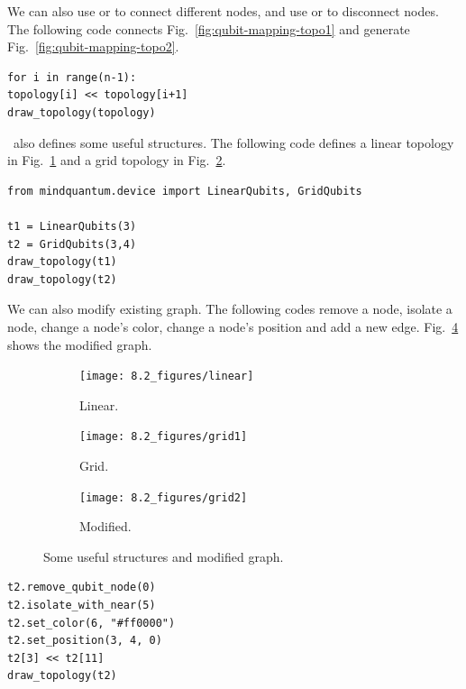 We can also use  or  to connect different nodes, and use  or  to disconnect nodes. The following code connects Fig.~\ref{fig:qubit-mapping-topo1} and generate Fig.~\ref{fig:qubit-mapping-topo2}.

\begin{lstlisting}
for i in range(n-1):
topology[i] << topology[i+1]
draw_topology(topology)
\end{lstlisting}

\MindQuantum\ also defines some useful structures. The following code defines a linear topology in Fig.~\ref{fig:qubit-mapping-linear} and a grid topology in Fig.~\ref{fig:qubit-mapping-grid1}.

\begin{lstlisting}
from mindquantum.device import LinearQubits, GridQubits

t1 = LinearQubits(3)
t2 = GridQubits(3,4)
draw_topology(t1)
draw_topology(t2)
\end{lstlisting}

We can also modify existing graph. The following codes remove a node, isolate a node, change a node's color, change a node's position and add a new edge. Fig.~\ref{fig:qubit-mapping-grid2} shows the modified graph.

\begin{figure}[H]
	\centering

	\begin{subfigure}{0.1\textwidth}
		\texttt{[image: 8.2\_figures/linear]}
		\caption{Linear.}
		\label{fig:qubit-mapping-linear}
	\end{subfigure}
	\begin{subfigure}{0.15\textwidth}
		\texttt{[image: 8.2\_figures/grid1]}
		\caption{Grid.}
		\label{fig:qubit-mapping-grid1}
	\end{subfigure}
	\begin{subfigure}{0.2\textwidth}
		\texttt{[image: 8.2\_figures/grid2]}
		\caption{Modified.}
		\label{fig:qubit-mapping-grid2}
	\end{subfigure}

	\caption{Some useful structures and modified graph.}
\end{figure}

\begin{lstlisting}
t2.remove_qubit_node(0)
t2.isolate_with_near(5)
t2.set_color(6, "#ff0000")
t2.set_position(3, 4, 0)
t2[3] << t2[11]
draw_topology(t2)
\end{lstlisting}

